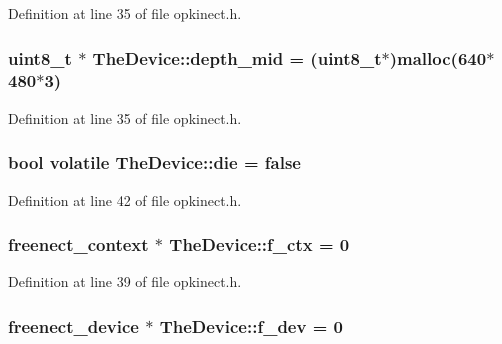 Definition at line 35 of file opkinect.\+h.

\hypertarget{class_the_device_a2b13e5d032110be8e42657f496bbbec8}{
\subsubsection[{depth\+\_\+mid}]{\setlength{\rightskip}{0pt plus 5cm}uint8\+\_\+t $\ast$ The\+Device\+::depth\+\_\+mid = (uint8\+\_\+t$\ast$)malloc(640$\ast$480$\ast$3)\hspace{0.3cm}{\ttfamily [static]}}}\label{class_the_device_a2b13e5d032110be8e42657f496bbbec8}


Definition at line 35 of file opkinect.\+h.

\hypertarget{class_the_device_ab301f4e54b7f298be586b6a119dbf9db}{
\subsubsection[{die}]{\setlength{\rightskip}{0pt plus 5cm}bool volatile The\+Device\+::die = false\hspace{0.3cm}{\ttfamily [static]}}}\label{class_the_device_ab301f4e54b7f298be586b6a119dbf9db}


Definition at line 42 of file opkinect.\+h.

\hypertarget{class_the_device_ac9679edd0e49b43515712cabf1644f9a}{
\subsubsection[{f\+\_\+ctx}]{\setlength{\rightskip}{0pt plus 5cm}freenect\+\_\+context $\ast$ The\+Device\+::f\+\_\+ctx = 0\hspace{0.3cm}{\ttfamily [static]}}}\label{class_the_device_ac9679edd0e49b43515712cabf1644f9a}


Definition at line 39 of file opkinect.\+h.

\hypertarget{class_the_device_a1ac2bb1c0f50ef433c645d05be0f4c43}{
\subsubsection[{f\+\_\+dev}]{\setlength{\rightskip}{0pt plus 5cm}freenect\+\_\+device $\ast$ The\+Device\+::f\+\_\+dev = 0\hspace{0.3cm}{\ttfamily [static]}}}\label{class_the_device_a1ac2bb1c0f50ef433c645d05be0f4c43}


